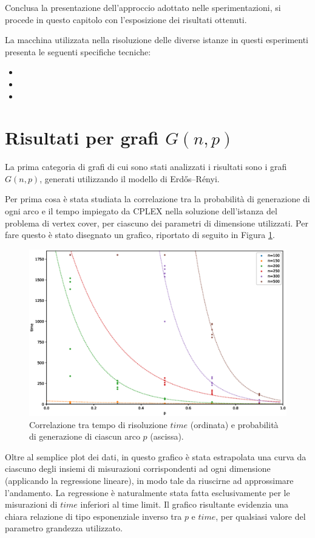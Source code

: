 Conclusa la presentazione dell'approccio adottato nelle sperimentazioni, si procede in questo capitolo con l'esposizione dei risultati ottenuti. 

La macchina utilizzata nella risoluzione delle diverse istanze in questi esperimenti presenta le seguenti specifiche tecniche:
\begin{itemize}
\item
\item
\item
\end{itemize}

\newpage
\section{Risultati per grafi $G(n,p)$}
La prima categoria di grafi di cui sono stati analizzati i risultati sono i grafi $G(n,p)$, generati utilizzando il modello di Erdős–Rényi. 

Per prima cosa è stata studiata la correlazione tra la probabilità di generazione di ogni arco e il tempo impiegato da CPLEX nella soluzione dell'istanza del problema di vertex cover, per ciascuno dei parametri di dimensione utilizzati. Per fare questo è stato disegnato un grafico, riportato di seguito in Figura \ref{fig:gnp2d}.
\vspace{-0.5cm}
\begin{figure}[h!]
     \centering
       \includegraphics[scale=0.4]{images/gnp-2d.eps}
       \caption{Correlazione tra tempo di risoluzione $time$ (ordinata) e probabilità di generazione di ciascun arco $p$ (ascissa).}
        \label{fig:gnp2d}
\end{figure}

Oltre al semplice plot dei dati, in questo grafico è stata estrapolata una curva da ciascuno degli insiemi di misurazioni corrispondenti ad ogni dimensione (applicando la regressione lineare), in modo tale da riuscirne ad approssimare l'andamento. La regressione è naturalmente stata fatta esclusivamente per le misurazioni di $time$ inferiori al time limit. Il grafico risultante evidenzia una chiara relazione di tipo esponenziale inverso tra $p$ e $time$, per qualsiasi valore del parametro grandezza utilizzato. 


